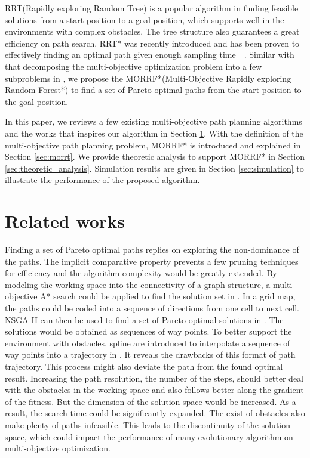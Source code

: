 \documentclass[conference]{IEEEtran}
\theoremstyle{definition}
\begin{document}
RRT(Rapidly exploring Random Tree) is a popular algorithm in finding feasible solutions from a start position to a goal position, which supports well in the environments with complex obstacles. 
The tree structure also guarantees a great efficiency on path search.
RRT* was recently introduced and has been proven to effectively finding an optimal path given enough sampling time~\cite{Karaman:2011:SAO:2000201.2000209}~\cite{Karaman.Frazzoli:RSS10}.
Similar with that decomposing the multi-objective optimization problem into a few subproblems in \cite{4358754}, we propose the MORRF*(Multi-Objective Rapidly exploring Random Forest*) to find a set of Pareto optimal paths from the start position to the goal position.

In this paper, we reviews a few existing multi-objective path planning algorithms and the works that inspires our algorithm in Section \ref{sec:related_works}.
With the definition of the multi-objective path planning problem, MORRF* is introduced and explained in Section \ref{sec:morrt}.
We provide theoretic analysis to support MORRF* in Section \ref{sec:theoretic_analysis}.
Simulation results are given in Section \ref{sec:simulation} to illustrate the performance of the proposed algorithm.

\section{Related works}
\label{sec:related_works}

Finding a set of Pareto optimal paths replies on exploring the non-dominance of the paths.
The implicit comparative property prevents a few pruning techniques for efficiency and the algorithm complexity would be greatly extended.
By modeling the working space into the connectivity of a graph structure, a multi-objective A* search could be applied to find the solution set in \cite{Mandow:2005:NAM:1642293.1642328}.
In a grid map, the paths could be coded into a sequence of directions from one cell to next cell.
NSGA-II can then be used to find a set of Pareto optimal solutions in \cite{Ahmed2013}.
The solutions would be obtained as sequences of way points.
To better support the environment with obstacles, spline are introduced to interpolate a sequence of way points into a trajectory in \cite{6181426}.
It reveals the drawbacks of this format of path trajectory. 
This process might also deviate the path from the found optimal result.
Increasing the path resolution, the number of the steps, should better deal with the obstacles in the working space and also follows better along the gradient of the fitness.
But the dimension of the solution space would be increased.
As a result, the search time could be significantly expanded.
The exist of obstacles also make plenty of paths infeasible.
This leads to the discontinuity of the solution space, which could impact the performance of many evolutionary algorithm on multi-objective optimization.
\end{document}
